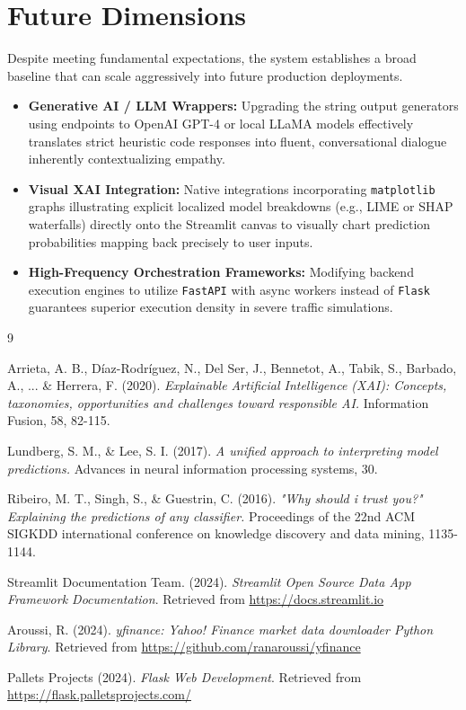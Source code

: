 \documentclass[12pt,a4paper]{report}
\begin{document}
\section{Future Dimensions}
Despite meeting fundamental expectations, the system establishes a broad baseline that can scale aggressively into future production deployments. 
\begin{itemize}
    \item \textbf{Generative AI / LLM Wrappers:} Upgrading the string output generators using endpoints to OpenAI GPT-4 or local LLaMA models effectively translates strict heuristic code responses into fluent, conversational dialogue inherently contextualizing empathy.
    \item \textbf{Visual XAI Integration:} Native integrations incorporating \texttt{matplotlib} graphs illustrating explicit localized model breakdowns (e.g., LIME or SHAP waterfalls) directly onto the Streamlit canvas to visually chart prediction probabilities mapping back precisely to user inputs.
    \item \textbf{High-Frequency Orchestration Frameworks:} Modifying backend execution engines to utilize \texttt{FastAPI} with async workers instead of \texttt{Flask} guarantees superior execution density in severe traffic simulations.
\end{itemize}

\pagebreak

\begin{thebibliography}{9}

Arrieta, A. B., Díaz-Rodríguez, N., Del Ser, J., Bennetot, A., Tabik, S., Barbado, A., ... \& Herrera, F. (2020). 
\textit{Explainable Artificial Intelligence (XAI): Concepts, taxonomies, opportunities and challenges toward responsible AI.} 
Information Fusion, 58, 82-115.

Lundberg, S. M., \& Lee, S. I. (2017).
\textit{A unified approach to interpreting model predictions.}
Advances in neural information processing systems, 30.

Ribeiro, M. T., Singh, S., \& Guestrin, C. (2016).
\textit{"Why should i trust you?" Explaining the predictions of any classifier.}
Proceedings of the 22nd ACM SIGKDD international conference on knowledge discovery and data mining, 1135-1144.

Streamlit Documentation Team. (2024).
\textit{Streamlit Open Source Data App Framework Documentation}. Retrieved from \url{https://docs.streamlit.io}

Aroussi, R. (2024).
\textit{yfinance: Yahoo! Finance market data downloader Python Library}. Retrieved from \url{https://github.com/ranaroussi/yfinance}

Pallets Projects (2024). 
\textit{Flask Web Development}. Retrieved from \url{https://flask.palletsprojects.com/}

\end{thebibliography}
\end{document}
